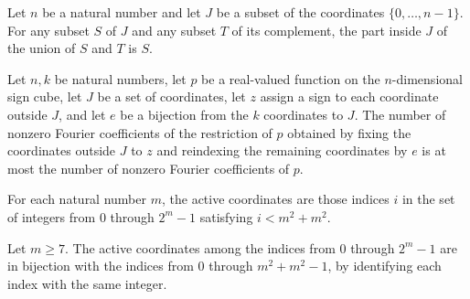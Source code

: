 \begin{theorem}
\label{FABL.freeFrequencyPart_lift_union}
\leanok
{}
Let $n$ be a natural number and let $J$ be a subset of the coordinates
$\{0,\ldots,n-1\}$. For any subset $S$ of $J$ and any subset $T$ of its complement, the
part inside $J$ of the union of $S$ and $T$ is $S$.
\end{theorem}

\begin{theorem}
\label{FABL.polynomialSparsity_reindexedRestriction_le}
\leanok
{}
Let $n,k$ be natural numbers, let $p$ be a real-valued function on the $n$-dimensional
sign cube, let $J$ be a set of coordinates, let $z$ assign a sign to each coordinate
outside $J$, and let $e$ be a bijection from the $k$ coordinates to $J$. The number of
nonzero Fourier coefficients of the restriction of $p$ obtained by fixing the
coordinates outside $J$ to $z$ and reindexing the remaining coordinates by $e$ is at
most the number of nonzero Fourier coefficients of $p$.
\end{theorem}

\begin{definition}
\label{FABL.ac0ActiveCoordinates}
\leanok
For each natural number $m$, the active coordinates are those indices $i$ in the set of
integers from $0$ through $2^m-1$ satisfying $i<m^2+m^2$.
\end{definition}

\begin{definition}
\label{FABL.ac0ActiveCoordinateEquiv}
\leanok
{}
Let $m\ge 7$. The active coordinates among the indices from $0$ through $2^m-1$ are in
bijection with the indices from $0$ through $m^2+m^2-1$, by identifying each index with
the same integer.
\end{definition}

